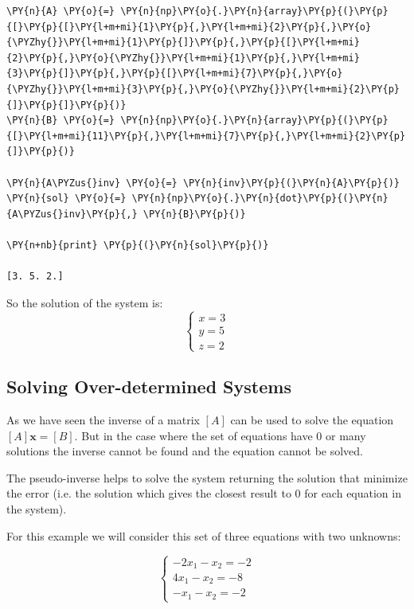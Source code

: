 \begin{tcolorbox}[breakable, size=fbox, boxrule=1pt, pad at break*=1mm,colback=cellbackground, colframe=cellborder]
\begin{Verbatim}[commandchars=\\\{\}]
\PY{n}{A} \PY{o}{=} \PY{n}{np}\PY{o}{.}\PY{n}{array}\PY{p}{(}\PY{p}{[}\PY{p}{[}\PY{l+m+mi}{1}\PY{p}{,}\PY{l+m+mi}{2}\PY{p}{,}\PY{o}{\PYZhy{}}\PY{l+m+mi}{1}\PY{p}{]}\PY{p}{,}\PY{p}{[}\PY{l+m+mi}{2}\PY{p}{,}\PY{o}{\PYZhy{}}\PY{l+m+mi}{1}\PY{p}{,}\PY{l+m+mi}{3}\PY{p}{]}\PY{p}{,}\PY{p}{[}\PY{l+m+mi}{7}\PY{p}{,}\PY{o}{\PYZhy{}}\PY{l+m+mi}{3}\PY{p}{,}\PY{o}{\PYZhy{}}\PY{l+m+mi}{2}\PY{p}{]}\PY{p}{]}\PY{p}{)}
\PY{n}{B} \PY{o}{=} \PY{n}{np}\PY{o}{.}\PY{n}{array}\PY{p}{(}\PY{p}{[}\PY{l+m+mi}{11}\PY{p}{,}\PY{l+m+mi}{7}\PY{p}{,}\PY{l+m+mi}{2}\PY{p}{]}\PY{p}{)}

\PY{n}{A\PYZus{}inv} \PY{o}{=} \PY{n}{inv}\PY{p}{(}\PY{n}{A}\PY{p}{)}
\PY{n}{sol} \PY{o}{=} \PY{n}{np}\PY{o}{.}\PY{n}{dot}\PY{p}{(}\PY{n}{A\PYZus{}inv}\PY{p}{,} \PY{n}{B}\PY{p}{)}

\PY{n+nb}{print} \PY{p}{(}\PY{n}{sol}\PY{p}{)}

[3. 5. 2.]
\end{Verbatim}
\end{tcolorbox}

So the solution of the system is: \[
\begin{cases}
x=3\\
y=5\\
z=2
\end{cases}
\]

\subsection{Solving Over-determined Systems}
\label{using-the-pseudoinverse-to-solve-a-overdetermined-system-of-linear-equations}

As we have seen the inverse of a matrix \([A]\) can be used to solve the equation \([A]\mathbf{x}=[B]\). But in the case where the set of equations have 0 or many solutions the inverse cannot be found and the equation cannot be solved. 

The pseudo-inverse helps to solve the system returning the solution that minimize the error (i.e. the solution which gives the closest result to 
0 for each equation in the system). 

For this example we will consider this set of three equations with two
unknowns:

\[
\begin{cases}
−2x_1−x_2=−2 \\
4x_1−x_2=−8 \\
−x_1−x_2=−2 
\end{cases}\]

